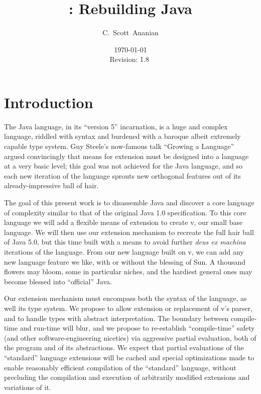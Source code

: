 \documentclass[11pt,notitlepage,twocolumn]{article}
\author{C.~Scott~Ananian}
\title{\vlang: Rebuilding Java}
\date{\today \\ $ $Revision: 1.8 $ $}
\newcommand{\vlang}{\textsf{v}\xspace}
\begin{document}

\maketitle

\section{Introduction}
The Java language, in its ``version 5'' incarnation, is a huge and
complex language, riddled with syntax and burdened with a baroque
albeit extremely capable type system.  Guy Steele's now-famous talk
``Growing a Language'' \cite{Steele99} argued convincingly that means
for extension must be designed into a language at a very basic level;
this goal was not achieved for the Java language, and so each new
iteration of the language sprouts new orthogonal features out of its
already-impressive ball of hair.

The goal of this present work is to disassemble Java and discover a
core language of complexity similar to that of the original Java
1.0 specification.  To this core language we will add a flexible means
of extension to create \vlang, our small base language.  We will then use
our extension mechanism to recreate the full hair ball of Java 5.0,
but this time built with a means to avoid further \emph{deus ex
  machina} iterations of the language.  From our new language built on
\vlang, we can add any new language feature we like, with or without the
blessing of Sun.  A thousand flowers may bloom, some in particular
niches, and the hardiest general ones may become blessed into
``official'' Java.

Our extension mechanism must encompass both the syntax of the
language, as well its type system.  We propose to allow extension or
replacement of \vlang's parser, and to handle types with abstract
interpretation.  The boundary between compile-time and run-time will
blur, and we propose to re-establish ``compile-time'' safety (and
other software-engineering niceties) via aggressive partial
evaluation, both of the program and of its abstractions.  We expect
that partial evaluations of the ``standard'' language extensions will
be cached and special optimizations made to enable reasonably
efficient compilation of the ``standard'' language, without precluding
the compilation and execution of arbitrarily modified extensions and
variations of it.
\end{document}
